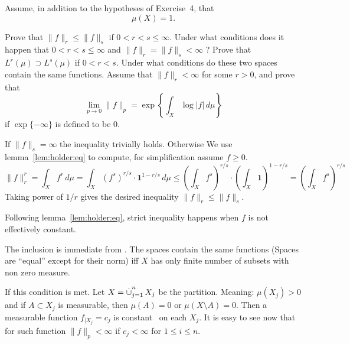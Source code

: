 \begin{enumerate}
\begin{itemize}
\end{itemize}

\begin{excopy}
Assume, in addition to the hypotheses of Exercise~4, that
\begin{equation*}
 \mu(X) = 1.
\end{equation*}
\begin{itemize}
 Prove that \(\|f\|_r \leq \|f\|_s\) if \(0<r<s\leq \infty\).
 Under what conditions does it happen that \(0<r<s\leq \infty\)
 and \(\|f\|_r = \|f\|_s < \infty\) ?
 Prove that
  \(L^r(\mu) \supset L^s(\mu)\) if \(0<r<s\).
 Under what conditions do these two spaces contain the same functions.
 Assume that \(\|f\|_r < \infty\) for some \(r>0\), and prove that
 \begin{equation*}
   \lim_{p\to 0} \|f\|_p = \exp\left\{\int_X \log|f|\,d\mu\right\}
 \end{equation*}
 if \(\exp\{-\infty\}\) is defined to be $0$.
\end{itemize}
\end{excopy}

\begin{itemize}
%
If \(\|f\|_s=\infty\) the inequality trivially holds. Otherwise
We use lemma~\ref{lem:holder:eq} to compute, for simplification
assume \(f\geq 0\).
\begin{equation*}
\|f\|_r^r
 = \int_X f^r\,d\mu
 = \int_X (f^s)^{r/s}\cdot \mathbf{1}^{1-r/s}\,d\mu
 \leq \left(\int_X f^s\right)^{r/s} \cdot \left(\int_X \mathbf{1}\right)^{1-r/s}
 = \left(\int_X f^s\right)^{r/s}
\end{equation*}
Taking power of \(1/r\) gives the desired inequality \(\|f\|_r \leq \|f\|_s\).

 Following lemma~\ref{lem:holder:eq}, strict inequality happens
 when $f$ is not effectively constant.

The inclusion is immediate from . The spaces contain the same
functions (Spaces are ``equal'' except for their norm) iff $X$ has only finite
number of subsets with non zero measure.

If this condition is met. Let \(X=\disjunion_{j=1}^n X_j\) be the partition.
Meaning: \(\mu(X_j)>0\) and if \(A\subset X_j\) is measurable, then
\(\mu(A)=0\) or \(\mu(X\setminus A)=0\).
Then a measurable function \(f_{|X_j}=c_j\)
is constant \aded\ on each \(X_j\).
It is easy to see now that for such function \(\|f\|_p < \infty\)
if \(c_j<\infty\) for \(1\leq i \leq n\).


\end{itemize}
\end{enumerate}
